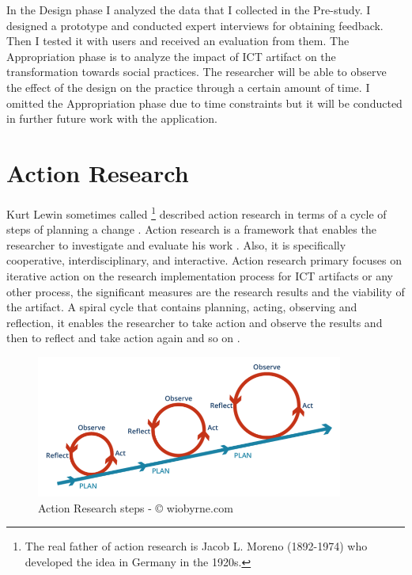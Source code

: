 In the Design phase I analyzed the data that I collected in the Pre-study. I designed a prototype and conducted expert interviews for obtaining feedback. Then I tested it with users and received an evaluation from them. The Appropriation phase is to analyze the impact of ICT artifact on the transformation towards social practices\citep{Wulf2011}. The researcher will be able to observe the effect of the design on the practice through a certain amount of time. I omitted the Appropriation phase due to time constraints but it will be conducted in further future work with the application.   


\section{Action Research}

Kurt Lewin sometimes called \footnote{The real father of action research is Jacob L. Moreno (1892-1974) who developed the idea in Germany in the 1920s.} described action research in terms of a cycle of steps of planning a change \citep{KemmisSdanMcTaggart1988}.
Action research is a framework that enables the researcher to investigate and evaluate his work \citep{Khanna2007AllResearch}. Also, it is specifically cooperative, interdisciplinary, and interactive. Action research primary focuses on iterative action on the research implementation process for ICT artifacts or any other process, the significant measures are the research results and the viability of the artifact. A spiral cycle that contains planning, acting, observing and reflection, it enables the researcher to take action and observe the results and then to reflect and take action again and so on \citep{Hayes2011TheInteraction}. 
\begin{figure}[ht]
    \centering
    \includegraphics[width=0.90\textwidth]{images/par.png}
    \caption{Action Research steps - © wiobyrne.com  }
    \label{fig:par}
\end{figure}

